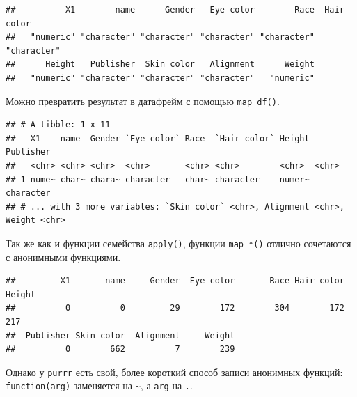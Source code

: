 \documentclass[]{book}
\newenvironment{Shaded}{\begin{snugshade}}{\end{snugshade}}
\newcommand{\KeywordTok}[1]{\textcolor[rgb]{0.13,0.29,0.53}{\textbf{#1}}}
\newcommand{\StringTok}[1]{\textcolor[rgb]{0.31,0.60,0.02}{#1}}
\newcommand{\ControlFlowTok}[1]{\textcolor[rgb]{0.13,0.29,0.53}{\textbf{#1}}}
\newcommand{\OperatorTok}[1]{\textcolor[rgb]{0.81,0.36,0.00}{\textbf{#1}}}
\newcommand{\NormalTok}[1]{#1}
\begin{document}
\begin{verbatim}
##          X1        name      Gender   Eye color        Race  Hair color 
##   "numeric" "character" "character" "character" "character" "character" 
##      Height   Publisher  Skin color   Alignment      Weight 
##   "numeric" "character" "character" "character"   "numeric"
\end{verbatim}

Можно превратить результат в датафрейм с помощью \texttt{map\_df()}.

\begin{Shaded}
\end{Shaded}

\begin{verbatim}
## # A tibble: 1 x 11
##   X1    name  Gender `Eye color` Race  `Hair color` Height Publisher
##   <chr> <chr> <chr>  <chr>       <chr> <chr>        <chr>  <chr>    
## 1 nume~ char~ chara~ character   char~ character    numer~ character
## # ... with 3 more variables: `Skin color` <chr>, Alignment <chr>, Weight <chr>
\end{verbatim}

Так же как и функции семейства \texttt{apply()}, функции
\texttt{map\_*()} отлично сочетаются с анонимными функциями.

\begin{Shaded}
\end{Shaded}

\begin{verbatim}
##         X1       name     Gender  Eye color       Race Hair color     Height 
##          0          0         29        172        304        172        217 
##  Publisher Skin color  Alignment     Weight 
##          0        662          7        239
\end{verbatim}

Однако у \texttt{purrr} есть свой, более короткий способ записи
анонимных функций: \texttt{function(arg)} заменяется на
\texttt{\textasciitilde{}}, а \texttt{arg} на \texttt{.}.
\end{document}

